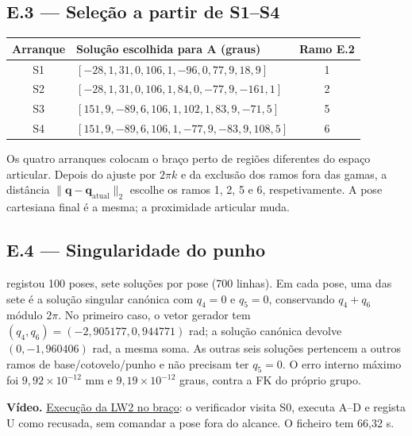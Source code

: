 \subsection{E.3 — Seleção a partir de S1–S4}
\begin{center}\small
\begin{tabular}{@{}clc@{}}\toprule
Arranque & Solução escolhida para A (graus) & Ramo E.2\\\midrule
S1 & $[-28{,}1,31{,}0,106{,}1,-96{,}0,77{,}9,18{,}9]$ & 1\\
S2 & $[-28{,}1,31{,}0,106{,}1,84{,}0,-77{,}9,-161{,}1]$ & 2\\
S3 & $[151{,}9,-89{,}6,106{,}1,102{,}1,83{,}9,-71{,}5]$ & 5\\
S4 & $[151{,}9,-89{,}6,106{,}1,-77{,}9,-83{,}9,108{,}5]$ & 6\\\bottomrule
\end{tabular}
\end{center}
Os quatro arranques colocam o braço perto de regiões diferentes do espaço articular. Depois do ajuste por $2\pi k$ e da exclusão dos ramos fora das gamas, a distância $\|\mathbf q-\mathbf q_{\mathrm{atual}}\|_2$ escolhe os ramos 1, 2, 5 e 6, respetivamente. A pose cartesiana final é a mesma; a proximidade articular muda.

\subsection{E.4 — Singularidade do punho}
 registou 100 poses, sete soluções por pose (700 linhas). Em cada pose, uma das sete é a solução singular canónica com $q_4=0$ e $q_5=0$, conservando $q_4+q_6$ módulo $2\pi$. No primeiro caso, o vetor gerador tem $(q_4,q_6)=(-2{,}905177,0{,}944771)$ rad; a solução canónica devolve $(0,-1{,}960406)$ rad, a mesma soma. As outras seis soluções pertencem a outros ramos de base/cotovelo/punho e não precisam ter $q_5=0$. O erro interno máximo foi $9{,}92\times10^{-12}$ mm e $9{,}19\times10^{-12}$ graus, contra a FK do próprio grupo.

\textbf{Vídeo.} \href{\repo/lw2/lw2_ik_real.mp4}{Execução da LW2 no braço}: o verificador visita S0, executa A–D e regista U como recusada, sem comandar a pose fora do alcance. O ficheiro tem 66,32 s.
